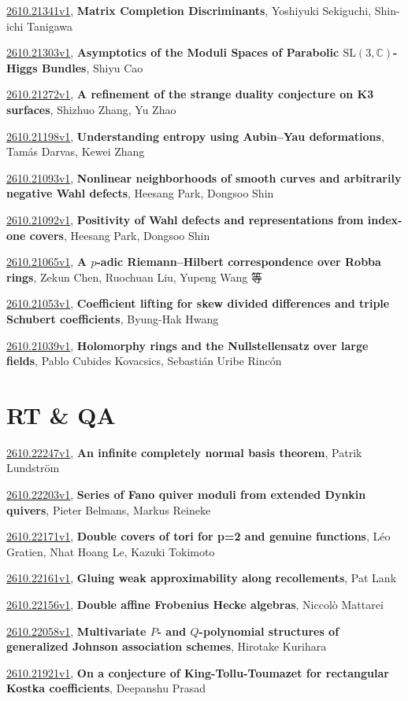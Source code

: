 \documentclass[9pt, a4paper]{article}
\theoremstyle{plain}
\theoremstyle{definition}
\theoremstyle{remark}
\newcommand{\arxiv}[3]{\href{https://arxiv.org/abs/#1}{#1}, \textbf{\textcolor{arxivblue}{#2}}, #3}
\begin{document}
\arxiv{2610.21341v1}{Matrix Completion Discriminants}{Yoshiyuki Sekiguchi, Shin-ichi Tanigawa}

\arxiv{2610.21303v1}{Asymptotics of the Moduli Spaces of Parabolic $\mathrm{SL}(3,\mathbb C)$-Higgs Bundles}{Shiyu Cao}

\arxiv{2610.21272v1}{A refinement of the strange duality conjecture on K3 surfaces}{Shizhuo Zhang, Yu Zhao}

\arxiv{2610.21198v1}{Understanding entropy using Aubin--Yau deformations}{Tamás Darvas, Kewei Zhang}

\arxiv{2610.21093v1}{Nonlinear neighborhoods of smooth curves and arbitrarily negative Wahl defects}{Heesang Park, Dongsoo Shin}

\arxiv{2610.21092v1}{Positivity of Wahl defects and representations from index-one covers}{Heesang Park, Dongsoo Shin}

\arxiv{2610.21065v1}{A $p$-adic Riemann--Hilbert correspondence over Robba rings}{Zekun Chen, Ruochuan Liu, Yupeng Wang 等}

\arxiv{2610.21053v1}{Coefficient lifting for skew divided differences and triple Schubert coefficients}{Byung-Hak Hwang}

\arxiv{2610.21039v1}{Holomorphy rings and the Nullstellensatz over large fields}{Pablo Cubides Kovacsics, Sebastián Uribe Rincón}


\section{RT \& QA}
\arxiv{2610.22247v1}{An infinite completely normal basis theorem}{Patrik Lundström}

\arxiv{2610.22203v1}{Series of Fano quiver moduli from extended Dynkin quivers}{Pieter Belmans, Markus Reineke}

\arxiv{2610.22171v1}{Double covers of tori for p=2 and genuine functions}{Léo Gratien, Nhat Hoang Le, Kazuki Tokimoto}

\arxiv{2610.22161v1}{Gluing weak approximability along recollements}{Pat Lank}

\arxiv{2610.22156v1}{Double affine Frobenius Hecke algebras}{Niccolò Mattarei}

\arxiv{2610.22058v1}{Multivariate $P$- and $Q$-polynomial structures of generalized Johnson association schemes}{Hirotake Kurihara}

\arxiv{2610.21921v1}{On a conjecture of King-Tollu-Toumazet for rectangular Kostka coefficients}{Deepanshu Prasad}
\end{document}
